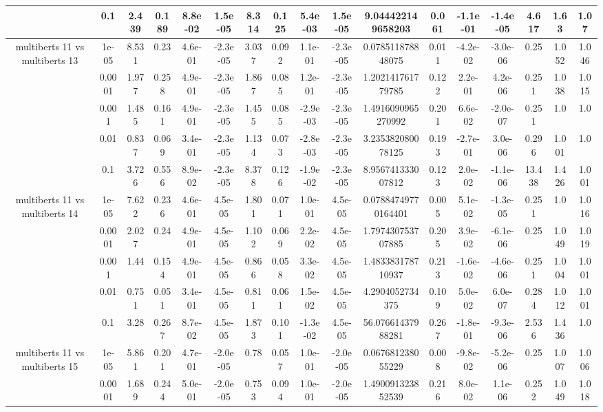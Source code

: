 \begin{tabular}{|c|c|c|c|c|c|c|c|c|c|c|c|c|c|c|c|c|}
 & 0.1 & 2.439 & 0.189 & 8.8e-02 & 1.5e-05 & 8.314 & 0.125 & 5.4e-03 & 1.5e-05 & 9.044422149658203 & 0.061 & -1.1e-01 & -1.4e-05 & 4.617 & 1.63 & 1.07 \\
\hline
\multirow{5}{*}{multiberts 11 vs multiberts 13} & 1e-05 & 8.531 & 0.23 & 4.6e-01 & -2.3e-05 & 3.037 & 0.092 & 1.1e-01 & -2.3e-05 & 0.078511878848075 & 0.011 & -4.2e-02 & -3.0e-06 & 0.25 & 1.052 & 1.046 \\
 & 0.0001 & 1.977 & 0.258 & 4.9e-01 & -2.3e-05 & 1.867 & 0.085 & 1.2e-01 & -2.3e-05 & 1.202141761779785 & 0.122 & 2.2e-01 & 4.2e-06 & 0.251 & 1.038 & 1.015 \\
 & 0.001 & 1.485 & 0.161 & 4.9e-01 & -2.3e-05 & 1.455 & 0.085 & -2.9e-03 & -2.3e-05 & 1.4916090965270992 & 0.201 & 6.6e-02 & -2.0e-07 & 0.251 & 1.0 & 1.0 \\
 & 0.01 & 0.837 & 0.069 & 3.4e-01 & -2.3e-05 & 1.134 & 0.073 & -2.8e-03 & -2.3e-05 & 3.235382080078125 & 0.193 & -2.7e-01 & 3.0e-06 & 0.296 & 1.001 & 1.0 \\
 & 0.1 & 3.726 & 0.556 & 8.9e-02 & -2.3e-05 & 8.378 & 0.126 & -1.9e-02 & -2.3e-05 & 8.956741333007812 & 0.123 & 2.0e-02 & -1.1e-06 & 13.438 & 1.426 & 1.001 \\
\hline
\multirow{5}{*}{multiberts 11 vs multiberts 14} & 1e-05 & 7.622 & 0.236 & 4.6e-01 & 4.5e-05 & 1.801 & 0.071 & 1.0e-01 & 4.5e-05 & 0.07884749770164401 & 0.005 & 5.1e-02 & -1.3e-05 & 0.251 & 1.0 & 1.016 \\
 & 0.0001 & 2.027 & 0.24 & 4.9e-01 & 4.5e-05 & 1.102 & 0.069 & 2.2e-02 & 4.5e-05 & 1.797430753707885 & 0.205 & 3.9e-02 & -6.1e-06 & 0.25 & 1.049 & 1.019 \\
 & 0.001 & 1.44 & 0.154 & 4.9e-01 & 4.5e-05 & 0.866 & 0.058 & 3.3e-02 & 4.5e-05 & 1.483383178710937 & 0.213 & -1.6e-02 & -4.6e-06 & 0.251 & 1.004 & 1.001 \\
 & 0.01 & 0.751 & 0.051 & 3.4e-01 & 4.5e-05 & 0.811 & 0.061 & 1.5e-02 & 4.5e-05 & 4.2904052734375 & 0.109 & 5.0e-02 & 6.0e-07 & 0.284 & 1.012 & 1.001 \\
 & 0.1 & 3.28 & 0.267 & 8.7e-02 & 4.5e-05 & 1.873 & 0.101 & -1.3e-02 & 4.5e-05 & 56.07661437988281 & 0.267 & -1.8e-01 & -9.3e-06 & 2.536 & 1.436 & 1.0 \\
\hline
\multirow{5}{*}{multiberts 11 vs multiberts 15} & 1e-05 & 5.861 & 0.201 & 4.7e-01 & -2.0e-05 & 0.78 & 0.057 & 1.0e-01 & -2.0e-05 & 0.067681238055229 & 0.008 & -9.8e-02 & -5.2e-06 & 0.25 & 1.007 & 1.006 \\
 & 0.0001 & 1.689 & 0.244 & 5.0e-01 & -2.0e-05 & 0.753 & 0.094 & 1.0e-01 & -2.0e-05 & 1.490091323852539 & 0.216 & 8.0e-02 & 1.1e-06 & 0.252 & 1.049 & 1.018 \\

\end{tabular}
